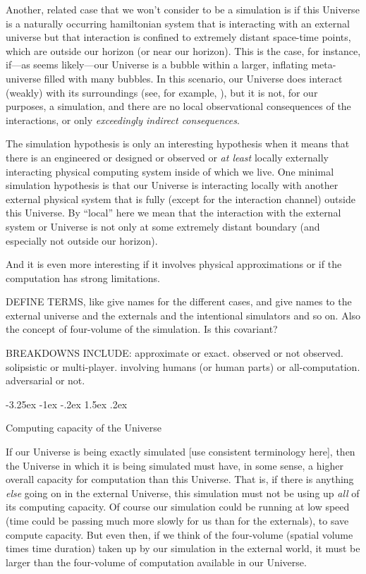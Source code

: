 \documentclass[letterpaper]{article}
\makeatletter
\renewcommand\section{\@startsection {section}{1}{\z@}%
  {-3.25ex \@plus -1ex \@minus -.2ex}%
  {1.5ex \@plus .2ex}%
  {\raggedright\normalfont\large\bfseries}}
\makeatother
\begin{document}
Another, related case that we won't consider to be a simulation is if this Universe is a naturally occurring hamiltonian system that is interacting with an external universe but that interaction is confined to extremely distant space-time points, which are outside our horizon (or near our horizon).
This is the case, for instance, if---as seems likely---our Universe is a bubble within a larger, inflating meta-universe filled with many bubbles.
In this scenario, our Universe does interact (weakly) with its surroundings (see, for example, \cite{kleban}), but it is not, for our purposes, a simulation, and there are no local observational consequences of the interactions, or only \emph{exceedingly indirect consequences}.

The simulation hypothesis is only an interesting hypothesis when it means that there is an engineered or designed or observed or \emph{at least} locally externally interacting physical computing system inside of which we live.
One minimal simulation hypothesis is that our Universe is interacting locally with another external physical system that is fully (except for the interaction channel) outside this Universe.
By ``local'' here we mean that the interaction with the external system or Universe is not only at some extremely distant boundary (and especially not outside our horizon).

And it is even more interesting if it involves physical approximations or if the computation has strong limitations.

DEFINE TERMS, like give names for the different cases, and give names to the external universe and the externals and the intentional simulators and so on. Also the concept of four-volume of the simulation. Is this covariant?

BREAKDOWNS INCLUDE: approximate or exact. observed or not observed. solipsistic or multi-player. involving humans (or human parts) or all-computation. adversarial or not.

\section{Computing capacity of the Universe}

If our Universe is being exactly simulated [use consistent terminology here], then the Universe in which it is being simulated must have, in some sense, a higher overall capacity for computation than this Universe.
That is, if there is anything \emph{else} going on in the external Universe, this simulation must not be using up \emph{all} of its computing capacity.
Of course our simulation could be running at low speed (time could be passing much more slowly for us than for the externals), to save compute capacity.
But even then, if we think of the four-volume (spatial volume times time duration) taken up by our simulation in the external world, it must be larger than the four-volume of computation available in our Universe.
\end{document}
